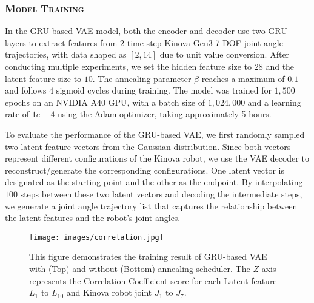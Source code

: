 \subsubsection{\textbf{\textsc{Model Training}}}

In the GRU-based VAE model, both the encoder and decoder use two GRU layers to extract features from $2$ time-step Kinova Gen3 7-DOF joint angle trajectories, with data shaped as $[2, 14]$ due to unit value conversion. After conducting multiple experiments, we set the hidden feature size to $28$ and the latent feature size to $10$. The annealing parameter $\beta$ reaches a maximum of $0.1$ and follows $4$ sigmoid cycles during training. The model was trained for $1,500$ epochs on an NVIDIA A$40$ GPU, with a batch size of $1,024,000$ and a learning rate of $1e-4$ using the Adam optimizer, taking approximately 5 hours.

To evaluate the performance of the GRU-based VAE, we first randomly sampled two latent feature vectors from the Gaussian distribution. Since both vectors represent different configurations of the Kinova robot, we use the VAE decoder to reconstruct/generate the corresponding configurations. One latent vector is designated as the starting point and the other as the endpoint. By interpolating $100$ steps between these two latent vectors and decoding the intermediate steps, we generate a joint angle trajectory list that captures the relationship between the latent features and the robot's joint angles. 

\begin{figure}[h]
    \centering
    \texttt{[image: images/correlation.jpg]}
    \captionsetup{font=footnotesize}
    \caption{This figure demonstrates the training result of GRU-based VAE with (Top) and without (Bottom) annealing scheduler. The \(Z\) axis represents the Correlation-Coefficient score for each Latent feature $L_1$ to $L_{10}$ and Kinova robot joint $J_1$ to $J_7$.}
    \label{fig:correlation}
    \vspace{-4.5mm}

\end{figure}

